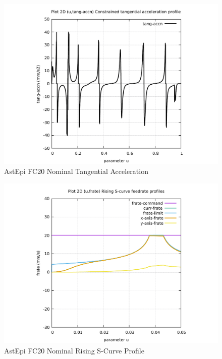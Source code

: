 \begin{figure}
	\caption     {AstEpi FC20 Nominal Tangential Acceleration}
	\label{14-img-AstEpi-FC20-Nominal-Tangential-Acceleration.pdf}
\includegraphics[width=1.00\textwidth]{Chap4/appendix/app-AstEpi/plots/14-img-AstEpi-FC20-Nominal-Tangential-Acceleration.pdf}
\end{figure}

\clearpage
\pagebreak

\begin{figure}
	\caption     {AstEpi FC20 Nominal Rising S-Curve Profile}
	\label{15-img-AstEpi-FC20-Nominal-Rising-S-Curve-Profile.pdf}
\includegraphics[width=1.00\textwidth]{Chap4/appendix/app-AstEpi/plots/15-img-AstEpi-FC20-Nominal-Rising-S-Curve-Profile.pdf}
\end{figure}


